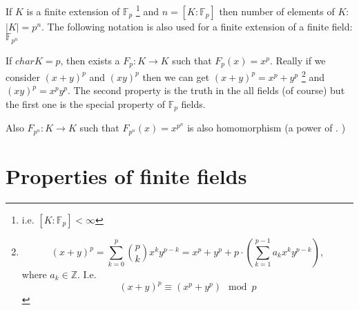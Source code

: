 \begin{remark}[$\mathbb{F}_{p^n}$]
  If $K$ is a finite extension of $\mathbb{F}_p$
  \footnote{
    i.e. $\left[K:\mathbb{F}_p\right] < \infty$
  }
  and
  $n = \left[K:\mathbb{F}_p\right]$ then number of elements of $K$:
  $\left|K\right| = p^n$. The following notation is also used for a
  finite extension of a finite field: $\mathbb{F}_{p^n}$
  \label{rem:fpn}
\end{remark}

\begin{remark}
  If $char K = p$, then exists a 
  $F_p: K \to K$ such that $F_p\left(x\right) = x^p$.
  Really if we consider $\left(x+y\right)^p$ and $\left(xy\right)^p$
  then we can get $\left(x+y\right)^p = x^p + y^p$
  \footnote{
    \[
    \left(x+y\right)^p = \sum_{k=0}^p {p \choose k} x^k y^{p-k}  =
    x^p + y^p + p \cdot \left( \sum_{k=1}^{p-1} a_k x^k y^{p-k} \right),
    \]
    where $a_k \in \mathbb{Z}$. I.e.
    \[
    \left(x+y\right)^p \equiv    
    \left(x^p + y^p\right)  \mod p
    \]    
  }
  and
  $\left(xy\right)^p = x^p y^p$. The second property is the truth in
  the all fields (of course) but the first one is the special property
  of $\mathbb{F}_p$ fields.
  \label{rem:frobeniushomomorphism}
\end{remark}

\begin{remark}
  Also $F_{p^n} : K \to K$ such that $F_{p^n}\left(x\right) = x^{p^n}$
  is also homomorphism (a power of .
  \label{rem:frobeniuspowerhomomorphism})
\end{remark}

\section{Properties of finite fields}

